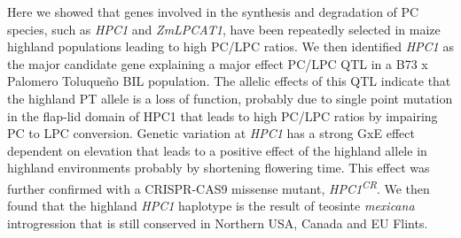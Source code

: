 \documentclass[9pt,twocolumn,twoside,lineno]{BioRxiv}
\begin{document}
Here we showed that genes involved in the synthesis and degradation of PC species, such as \textit{HPC1} and \textit{ZmLPCAT1}, have been repeatedly selected in maize highland populations leading to high PC/LPC ratios.   
We then identified \textit{HPC1} as the major candidate gene explaining a major effect PC/LPC QTL in a B73 x Palomero Toluqueño BIL population. 
The allelic effects of this QTL indicate that the highland PT allele is a loss of function, probably due to single point mutation in the flap-lid domain of HPC1 that leads to high PC/LPC ratios by impairing PC to LPC conversion. 
Genetic variation at \textit{HPC1} has a strong GxE effect dependent on elevation that leads to a positive effect of the highland allele in highland environments probably by shortening flowering time.
This effect was further confirmed with a CRISPR-CAS9 missense mutant, \textit{HPC1\textsuperscript{CR}}.
We then found that the highland \textit{HPC1} haplotype is the result of teosinte \textit{mexicana} introgression that is still conserved in Northern USA, Canada and EU Flints. 
\end{document}
